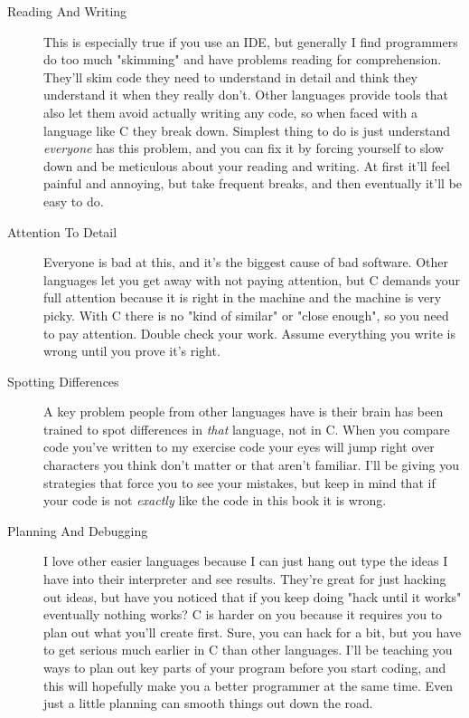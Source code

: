 \begin{description}
\item[Reading And Writing] This is especially true if you use an IDE, but
    generally I find programmers do too much "skimming" and have problems
    reading for comprehension.  They'll skim code they need to understand
    in detail and think they understand it when they really don't.  Other languages
    provide tools that also let them avoid actually writing any code, so
    when faced with a language like C they break down.  Simplest thing to
    do is just understand \emph{everyone} has this problem, and you can fix
    it by forcing yourself to slow down and be meticulous about your reading
    and writing.  At first it'll feel painful and annoying, but take frequent
    breaks, and then eventually it'll be easy to do.

\item[Attention To Detail] Everyone is bad at this, and it's the biggest cause
    of bad software.  Other languages let you get away with not paying attention,
    but C demands your full attention because it is right in the machine and the
    machine is very picky.  With C there is no "kind of similar" or "close enough",
    so you need to pay attention.  Double check your work.  Assume everything you
    write is wrong until you prove it's right.

\item[Spotting Differences] A key problem people from other languages have is 
    their brain has been trained to spot differences in \emph{that} language,
    not in C.  When you compare code you've written to my exercise code your
    eyes will jump right over characters you think don't matter or that aren't
    familiar.  I'll be giving you strategies that force you to see your 
    mistakes, but keep in mind that if your code is not \emph{exactly} like
    the code in this book it is wrong.

\item[Planning And Debugging]  I love other easier languages because I can
    just hang out type the ideas I have into their interpreter and see results.
    They're great for just hacking out ideas, but have you noticed that if you
    keep doing "hack until it works" eventually nothing works?  C is harder on
    you because it requires you to plan out what you'll create first.  Sure,
    you can hack for a bit, but you have to get serious much earlier in C than
    other languages.  I'll be teaching you ways to plan out key parts of your
    program before you start coding, and this will hopefully make you a
    better programmer at the same time.  Even just a little planning can smooth
    things out down the road.
\end{description}

